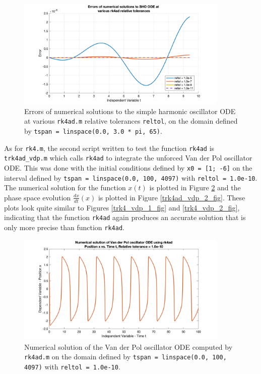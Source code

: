 \documentclass[10pt]{article}
\def\code#1{\texttt{#1}} %
\begin{document}
\begin{figure}[H]
\centering
\includegraphics[width=0.9\textwidth]{trk4ad_sho_2.png}
\caption{Errors of numerical solutions to the simple harmonic oscillator ODE at various \code{rk4ad.m}
relative tolerances \code{reltol}, on the domain defined by \code{tspan = linspace(0.0, 3.0 * pi, 65)}.
}\label{trk4ad_sho_2_fig}
\end{figure}

As for \code{rk4.m}, the second script written to test the function \code{rk4ad} is \code{trk4ad\_vdp.m}
which calls \code{rk4ad} to integrate the unforced Van der Pol oscillator ODE. This was done with the 
initial conditions defined by \code{x0 = [1; -6]} on the interval defined by 
\code{tspan = linspace(0.0, 100, 4097)} with \code{reltol = 1.0e-10}. The numerical solution for the 
function $x(t)$ is plotted in Figure \ref{trk4ad_vdp_1_fig} and the phase space evolution 
$\frac{dx}{dt}(x)$ is plotted in Figure \ref{trk4ad_vdp_2_fig}. These plots look quite similar to 
Figures \ref{trk4_vdp_1_fig} and \ref{trk4_vdp_2_fig}, indicating that the function \code{rk4ad} again 
produces an accurate solution that is only more precise than function \code{rk4ad}.

\begin{figure}[H]
\centering
\includegraphics[width=0.9\textwidth]{trk4ad_vdp_1.png}
\caption{Numerical solution of the Van der Pol oscillator ODE computed by \code{rk4ad.m} on the domain
defined by \code{tspan = linspace(0.0, 100, 4097)} with \code{reltol = 1.0e-10}.}
\label{trk4ad_vdp_1_fig}
\end{figure}
\end{document}
